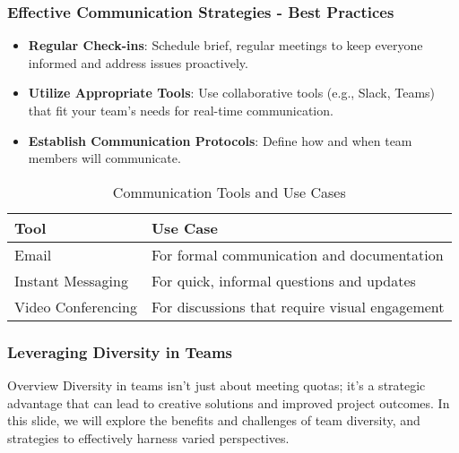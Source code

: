 \documentclass[aspectratio=169]{beamer}
\begin{document}
\begin{frame}[fragile]
    \frametitle{Effective Communication Strategies - Best Practices}
    \begin{itemize}
        \item \textbf{Regular Check-ins}: Schedule brief, regular meetings to keep everyone informed and address issues proactively.
        \item \textbf{Utilize Appropriate Tools}: Use collaborative tools (e.g., Slack, Teams) that fit your team's needs for real-time communication.
        \item \textbf{Establish Communication Protocols}: Define how and when team members will communicate.
    \end{itemize}
    
    \begin{table}[ht]
        \centering
        \begin{tabular}{|l|l|}
        \hline
        \textbf{Tool}          & \textbf{Use Case}                               \\ \hline
        Email                  & For formal communication and documentation      \\ \hline
        Instant Messaging      & For quick, informal questions and updates       \\ \hline
        Video Conferencing     & For discussions that require visual engagement   \\ \hline
        \end{tabular}
        \caption{Communication Tools and Use Cases}
    \end{table}
\end{frame}

\begin{frame}[fragile]
    \frametitle{Leveraging Diversity in Teams}
    \begin{block}{Overview}
        Diversity in teams isn’t just about meeting quotas; it’s a strategic advantage that can lead to creative solutions and improved project outcomes. In this slide, we will explore the benefits and challenges of team diversity, and strategies to effectively harness varied perspectives.
    \end{block}
\end{frame}
\end{document}
